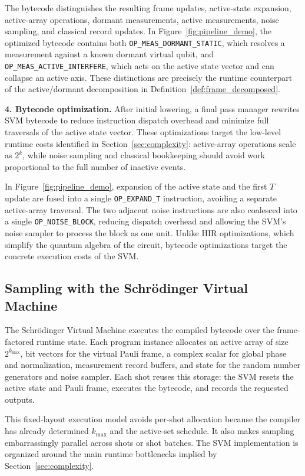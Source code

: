 \documentclass[a4paper, onecolumn, unpublished]{quantumarticle}
\begin{document}
    The bytecode distinguishes the resulting frame updates, active-state expansion, active-array operations, dormant measurements, active measurements, noise sampling, and classical record updates. In Figure~\ref{fig:pipeline_demo}, the optimized bytecode contains both \texttt{OP\_MEAS\_DORMANT\_STATIC}, which resolves a measurement against a known dormant virtual qubit, and \texttt{OP\_MEAS\_ACTIVE\_INTERFERE}, which acts on the active state vector and can collapse an active axis. These distinctions are precisely the runtime counterpart of the active/dormant decomposition in Definition~\ref{def:frame_decomposed}.

    \textbf{4. Bytecode optimization.}
    After initial lowering, a final pass manager rewrites SVM bytecode to reduce instruction dispatch overhead and minimize full traversals of the active state vector. These optimizations target the low-level runtime costs identified in Section~\ref{sec:complexity}: active-array operations scale as $2^k$, while noise sampling and classical bookkeeping should avoid work proportional to the full number of inactive events.

    In Figure~\ref{fig:pipeline_demo}, expansion of the active state and the first $T$ update are fused into a single \texttt{OP\_EXPAND\_T} instruction, avoiding a separate active-array traversal. The two adjacent noise instructions are also coalesced into a single \texttt{OP\_NOISE\_BLOCK}, reducing dispatch overhead and allowing the SVM's noise sampler to process the block as one unit. Unlike HIR optimizations, which simplify the quantum algebra of the circuit, bytecode optimizations target the concrete execution costs of the SVM.

    \subsection{Sampling with the Schr\"odinger Virtual Machine}
    \label{sec:svm}

    The Schr\"odinger Virtual Machine executes the compiled bytecode over the frame-factored runtime state. Each program instance allocates an active array of size $2^{k_{\max}}$, bit vectors for the virtual Pauli frame, a complex scalar for global phase and normalization, measurement record buffers, and state for the random number generators and noise sampler. Each shot reuses this storage: the SVM resets the active state and Pauli frame, executes the bytecode, and records the requested outputs.

    This fixed-layout execution model avoids per-shot allocation because the compiler has already determined $k_{\max}$ and the active-set schedule. It also makes sampling embarrassingly parallel across shots or shot batches. The SVM implementation is organized around the main runtime bottlenecks implied by Section~\ref{sec:complexity}.
\end{document}
